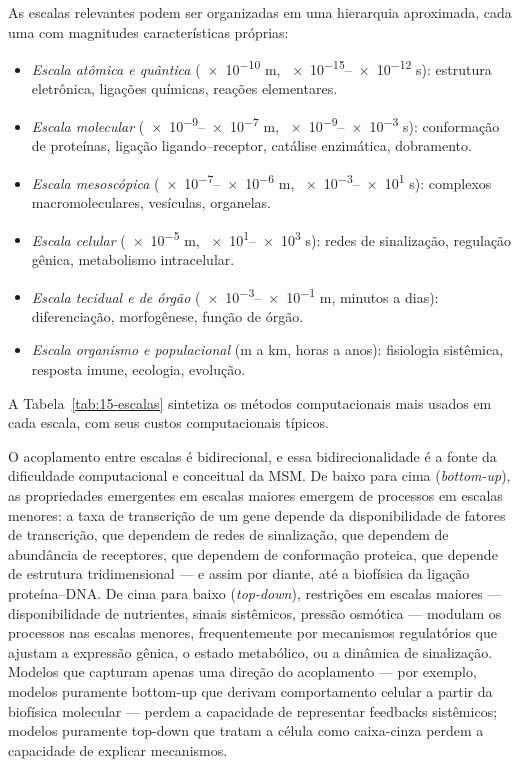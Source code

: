 As escalas relevantes podem ser organizadas em uma hierarquia aproximada, cada uma com magnitudes características próprias:

\begin{definicaoenv}
\begin{itemize}
  \item \emph{Escala atômica e quântica} (\num{e-10} m, \num{e-15}--\num{e-12} s): estrutura eletrônica, ligações químicas, reações elementares.
  \item \emph{Escala molecular} (\num{e-9}--\num{e-7} m, \num{e-9}--\num{e-3} s): conformação de proteínas, ligação ligando--receptor, catálise enzimática, dobramento.
  \item \emph{Escala mesoscópica} (\num{e-7}--\num{e-6} m, \num{e-3}--\num{e1} s): complexos macromoleculares, vesículas, organelas.
  \item \emph{Escala celular} (\num{e-5} m, \num{e1}--\num{e3} s): redes de sinalização, regulação gênica, metabolismo intracelular.
  \item \emph{Escala tecidual e de órgão} (\num{e-3}--\num{e-1} m, minutos a dias): diferenciação, morfogênese, função de órgão.
  \item \emph{Escala organismo e populacional} (m a km, horas a anos): fisiologia sistêmica, resposta imune, ecologia, evolução.
\end{itemize}
A Tabela~\ref{tab:15-escalas} sintetiza os métodos computacionais mais usados em cada escala, com seus custos computacionais típicos.
\end{definicaoenv}



O acoplamento entre escalas é bidirecional, e essa bidirecionalidade é a fonte da dificuldade computacional e conceitual da MSM. De baixo para cima (\emph{bottom-up}), as propriedades emergentes em escalas maiores emergem de processos em escalas menores: a taxa de transcrição de um gene depende da disponibilidade de fatores de transcrição, que dependem de redes de sinalização, que dependem de abundância de receptores, que dependem de conformação proteica, que depende de estrutura tridimensional --- e assim por diante, até a biofísica da ligação proteína--DNA. De cima para baixo (\emph{top-down}), restrições em escalas maiores --- disponibilidade de nutrientes, sinais sistêmicos, pressão osmótica --- modulam os processos nas escalas menores, frequentemente por mecanismos regulatórios que ajustam a expressão gênica, o estado metabólico, ou a dinâmica de sinalização. Modelos que capturam apenas uma direção do acoplamento --- por exemplo, modelos puramente bottom-up que derivam comportamento celular a partir da biofísica molecular --- perdem a capacidade de representar feedbacks sistêmicos; modelos puramente top-down que tratam a célula como caixa-cinza perdem a capacidade de explicar mecanismos.

